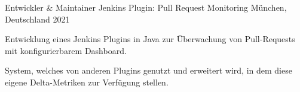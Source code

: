 

\begin{cventries}

  \cventry
    {Entwickler \& Maintainer} %
    {Jenkins Plugin: Pull Request Monitoring} %
    {München, Deutschland} %
    {2021} %
    {
      \begin{cvitems} %
        \item {Entwicklung eines Jenkins Plugins in Java zur Überwachung von Pull-Requests mit konfigurierbarem Dashboard.}
        \item {System, welches von anderen Plugins genutzt und erweitert wird, in dem diese eigene Delta-Metriken zur Verfügung stellen.}
      \end{cvitems}
    }

\end{cventries}
